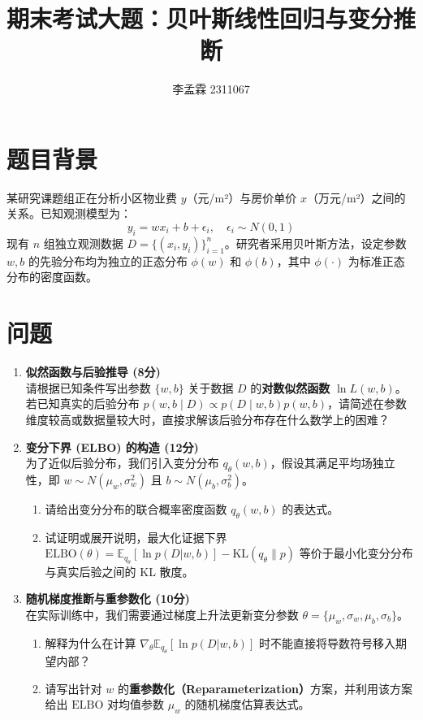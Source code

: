 \documentclass[11pt,a4paper]{article}
\title{\textbf{期末考试大题：贝叶斯线性回归与变分推断}}
\author{李孟霖 2311067}
\date{}
\begin{document}
\maketitle

\section*{题目背景}
某研究课题组正在分析小区物业费 $y$（元/m²）与房价单价 $x$（万元/m²）之间的关系。已知观测模型为：
\begin{equation}
y_i = wx_i + b + \epsilon_i, \quad \epsilon_i \sim N(0, 1)
\end{equation}
现有 $n$ 组独立观测数据 $D = \{(x_i, y_i)\}_{i=1}^n$。研究者采用贝叶斯方法，设定参数 $w, b$ 的先验分布均为独立的正态分布 $\phi(w)$ 和 $\phi(b)$，其中 $\phi(\cdot)$ 为标准正态分布的密度函数。

\section*{问题}

\begin{enumerate}[label=(\arabic*)]
    \item \textbf{似然函数与后验推导 (8分)} \\
    请根据已知条件写出参数 $\{w, b\}$ 关于数据 $D$ 的\textbf{对数似然函数} $\ln L(w, b)$。若已知真实的后验分布 $p(w, b \mid D) \propto p(D \mid w, b)p(w, b)$，请简述在参数维度较高或数据量较大时，直接求解该后验分布存在什么数学上的困难？

    \item \textbf{变分下界 (ELBO) 的构造 (12分)} \\
    为了近似后验分布，我们引入变分分布 $q_\theta(w, b)$，假设其满足平均场独立性，即 $w \sim N(\mu_w, \sigma_w^2)$ 且 $b \sim N(\mu_b, \sigma_b^2)$。
    \begin{enumerate}[label=\alph*.]
        \item 请给出变分分布的联合概率密度函数 $q_\theta(w, b)$ 的表达式。
        \item 试证明或展开说明，最大化证据下界 $\text{ELBO}(\theta) = \mathbb{E}_{q_\theta} [\ln p(D|w, b)] - \text{KL}(q_\theta \parallel p)$ 等价于最小化变分分布与真实后验之间的 KL 散度。
    \end{enumerate}

    \item \textbf{随机梯度推断与重参数化 (10分)} \\
    在实际训练中，我们需要通过梯度上升法更新变分参数 $\theta = \{\mu_w, \sigma_w, \mu_b, \sigma_b\}$。
    \begin{enumerate}[label=\alph*.]
        \item 解释为什么在计算 $\nabla_\theta \mathbb{E}_{q_\theta} [\ln p(D|w, b)]$ 时不能直接将导数符号移入期望内部？
        \item 请写出针对 $w$ 的\textbf{重参数化（Reparameterization）}方案，并利用该方案给出 $\text{ELBO}$ 对均值参数 $\mu_w$ 的随机梯度估算表达式。
    \end{enumerate}
\end{enumerate}
\end{document}
